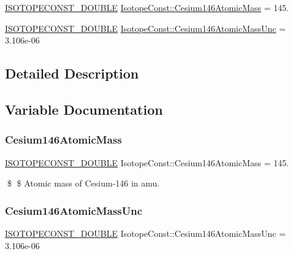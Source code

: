 \begin{DoxyCompactItemize}
\item 
\mbox{\hyperlink{group___isotope_const-_macros_ga8f45a7272ce02c0b4c65c44636ed719a}{I\+S\+O\+T\+O\+P\+E\+C\+O\+N\+S\+T\+\_\+\+D\+O\+U\+B\+LE}} \mbox{\hyperlink{group___isotope_const-_cesium-_cs146_ga85264ae5465b50f238b3b050c7bbc6b3}{Isotope\+Const\+::\+Cesium146\+Atomic\+Mass}} = 145.
\item 
\mbox{\hyperlink{group___isotope_const-_macros_ga8f45a7272ce02c0b4c65c44636ed719a}{I\+S\+O\+T\+O\+P\+E\+C\+O\+N\+S\+T\+\_\+\+D\+O\+U\+B\+LE}} \mbox{\hyperlink{group___isotope_const-_cesium-_cs146_ga945b2e61459df349c39c84d9e4b195af}{Isotope\+Const\+::\+Cesium146\+Atomic\+Mass\+Unc}} = 3.\+106e-\/06
\end{DoxyCompactItemize}


\subsection{Detailed Description}


\subsection{Variable Documentation}
\mbox{\label{group___isotope_const-_cesium-_cs146_ga85264ae5465b50f238b3b050c7bbc6b3}} 
\subsubsection{\texorpdfstring{Cesium146\+Atomic\+Mass}{Cesium146AtomicMass}}
{\footnotesize\ttfamily \mbox{\hyperlink{group___isotope_const-_macros_ga8f45a7272ce02c0b4c65c44636ed719a}{I\+S\+O\+T\+O\+P\+E\+C\+O\+N\+S\+T\+\_\+\+D\+O\+U\+B\+LE}} Isotope\+Const\+::\+Cesium146\+Atomic\+Mass = 145.}

\$ \$ Atomic mass of Cesium-\/146 in amu. \mbox{\label{group___isotope_const-_cesium-_cs146_ga945b2e61459df349c39c84d9e4b195af}} 
\subsubsection{\texorpdfstring{Cesium146\+Atomic\+Mass\+Unc}{Cesium146AtomicMassUnc}}
{\footnotesize\ttfamily \mbox{\hyperlink{group___isotope_const-_macros_ga8f45a7272ce02c0b4c65c44636ed719a}{I\+S\+O\+T\+O\+P\+E\+C\+O\+N\+S\+T\+\_\+\+D\+O\+U\+B\+LE}} Isotope\+Const\+::\+Cesium146\+Atomic\+Mass\+Unc = 3.\+106e-\/06}

